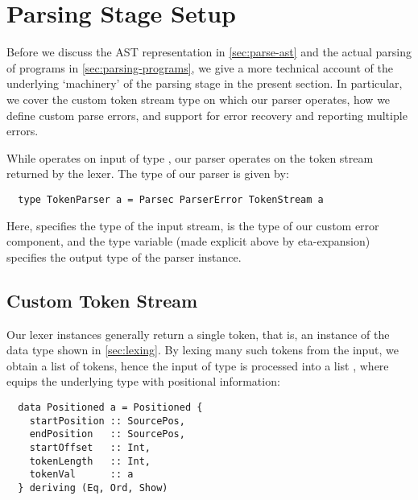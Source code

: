




\section{Parsing Stage Setup} \label{sec:parsing-setup}

Before we discuss the AST representation in \cref{sec:parse-ast} and the actual
parsing of programs in \cref{sec:parsing-programs}, we give a more technical
account of the underlying `machinery' of the parsing stage in the present
section. In particular, we cover the custom token stream type on which our
parser operates, how we define custom parse errors, and support for error
recovery and reporting multiple errors.

While  operates on input of type , our parser
 operates on the token stream returned by the lexer.
The type of our parser is given by:
%
\begin{verbatim}
  type TokenParser a = Parsec ParserError TokenStream a
\end{verbatim}
Here,  specifies the type of the input stream,
 is the type of our custom error component, and the type
variable  (made explicit above by eta-expansion) specifies the output
type of the parser instance.


\subsection{Custom Token Stream}

Our lexer instances generally return a single token, that is, an instance of
the  data type shown in \cref{sec:lexing}. By lexing many such
tokens from the input, we obtain a list of tokens, hence the input of type
 is processed into a list ,
where  equips the underlying type  with positional
information:
\begin{verbatim}
  data Positioned a = Positioned {
    startPosition :: SourcePos,
    endPosition   :: SourcePos,
    startOffset   :: Int,
    tokenLength   :: Int,
    tokenVal      :: a
  } deriving (Eq, Ord, Show)
\end{verbatim}

